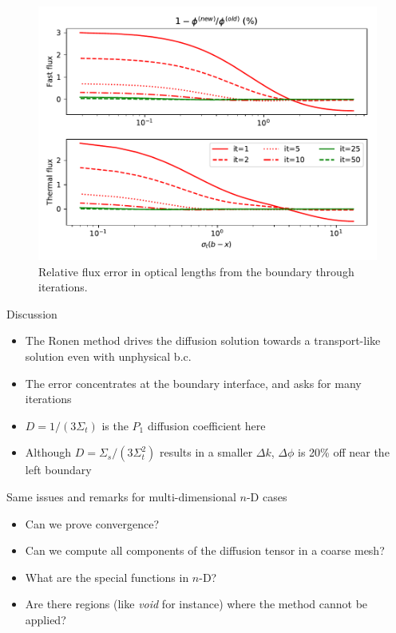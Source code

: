\documentclass[black]{slideCEA}
\begin{document}
\begin{frame}[allowframebreaks]
  \begin{figure}
    \centering
    \includegraphics[width=.8\textwidth]{../figures/eflxconv.pdf}
    \caption{Relative flux error in optical lengths from the boundary
             through iterations.}
  \end{figure}

  \begin{exampleblock}{Discussion}\tt
  \begin{itemize}
    \item The Ronen method drives the diffusion solution towards a transport-like solution even with unphysical b.c.
    \item The error concentrates at the boundary interface, and asks for many iterations
    \item $D=1/(3\Sigma_t)$ is the $P_1$ diffusion coefficient here
    \item Although $D=\Sigma_s/(3\Sigma_t^2)$ results in a smaller $\Delta k$, $\Delta \phi$ is 20\% off near the left boundary
  \end{itemize}
  \end{exampleblock}
  \vspace{10mm}

  \begin{alertblock}{Same issues and remarks for multi-dimensional $n$-D cases}\tt
  \begin{itemize}
    \item Can we prove convergence?
    \item Can we compute all components of the diffusion tensor in a coarse mesh?
    \item What are the special functions in $n$-D?
    \item Are there regions (like \emph{void} for instance) where the method cannot be applied?
  \end{itemize}
  \end{alertblock}
\end{frame}
\end{document}
